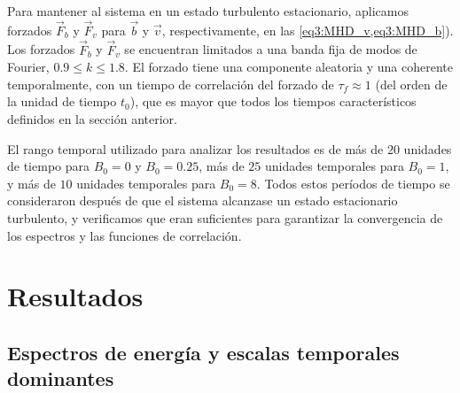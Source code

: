 Para mantener al sistema
en un estado turbulento estacionario, aplicamos forzados $\vec{F}_b$ y
$\vec{F}_v$ para $\vec{b}$ y $\vec{v}$, respectivamente, en las
\cref{eq3:MHD_v,eq3:MHD_b}). Los forzados $\vec{F}_b$ y $\vec{F}_v$ se
encuentran limitados a una banda fija de modos de Fourier,
$0.9\leq k \leq 1.8$. El forzado tiene una componente aleatoria y una
coherente temporalmente, con un tiempo de correlación del forzado de
$\tau_f \approx 1$ (del orden de la unidad de tiempo $t_0$), que es
mayor que todos los tiempos característicos definidos en la sección
anterior. 

El rango temporal utilizado para analizar los resultados es de más de
$20$ unidades de tiempo para $B_0=0$ y $B_0=0.25$, más de $25$
unidades temporales para $B_0=1$, y más de $10$ unidades temporales
para $B_0=8$. Todos estos períodos de tiempo se consideraron después
de que el sistema alcanzase un estado estacionario turbulento, y
verificamos que eran suficientes para garantizar la convergencia de
los espectros y las funciones de correlación.


\section{Resultados}\label{sec3:Res}

\subsection{Espectros de energía y escalas temporales dominantes}

